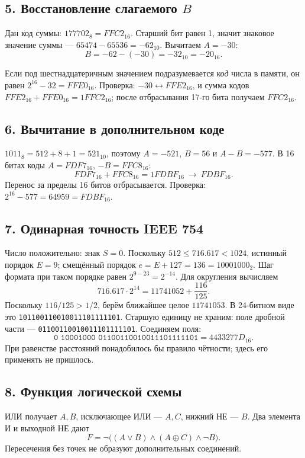 \subsection*{5. Восстановление слагаемого $B$}
Дан код суммы: $177702_8=FFC2_{16}$. Старший бит равен 1, значит знаковое значение суммы --- $65474-65536=-62_{10}$. Вычитаем $A=-30$:
\[
B=-62-(-30)=-32_{10}=\boxed{-20_{16}}.
\]

Если под шестнадцатеричным значением подразумевается \emph{код} числа в памяти, он равен $2^{16}-32=\boxed{FFE0_{16}}$. Проверка: $-30\leftrightarrow FFE2_{16}$, и сумма кодов $FFE2_{16}+FFE0_{16}=1FFC2_{16}$; после отбрасывания 17-го бита получаем $FFC2_{16}$.

\subsection*{6. Вычитание в дополнительном коде}
$1011_8=512+8+1=521_{10}$, поэтому $A=-521$, $B=56$ и $A-B=-577$. В 16 битах коды $A=FDF7_{16}$, $-B=FFC8_{16}$:
\[
FDF7_{16}+FFC8_{16}=1FDBF_{16}
\ \longrightarrow\ \boxed{FDBF_{16}}.
\]
Перенос за пределы 16 битов отбрасывается. Проверка: $2^{16}-577=64959=FDBF_{16}$.

\subsection*{7. Одинарная точность IEEE 754}
Число положительно: знак $S=0$. Поскольку $512\le716.617<1024$, истинный порядок $E=9$; смещённый порядок $e=E+127=136=10001000_2$. Шаг формата при таком порядке равен $2^{9-23}=2^{-14}$. Для округления вычисляем
\[
716.617\cdot2^{14}=11741052+\frac{116}{125}.
\]
Поскольку $116/125>1/2$, берём ближайшее целое $11741053$. В 24-битном виде это \texttt{101100110010011101111101}. Старшую единицу не храним: поле дробной части --- \texttt{01100110010011101111101}. Соединяем поля:
\[
\texttt{0 10001000 01100110010011101111101}
=\boxed{4433277D_{16}}.
\]
При равенстве расстояний понадобилось бы правило чётности; здесь его применять не пришлось.

\subsection*{8. Функция логической схемы}
ИЛИ получает $A,B$, исключающее ИЛИ --- $A,C$, нижний НЕ --- $B$. Два элемента И и выходной НЕ дают
\[
\boxed{F=\lnot\bigl((A\lor B)\land(A\oplus C)\land\lnot B\bigr)}.
\]
Пересечения без точек не образуют дополнительных соединений.

